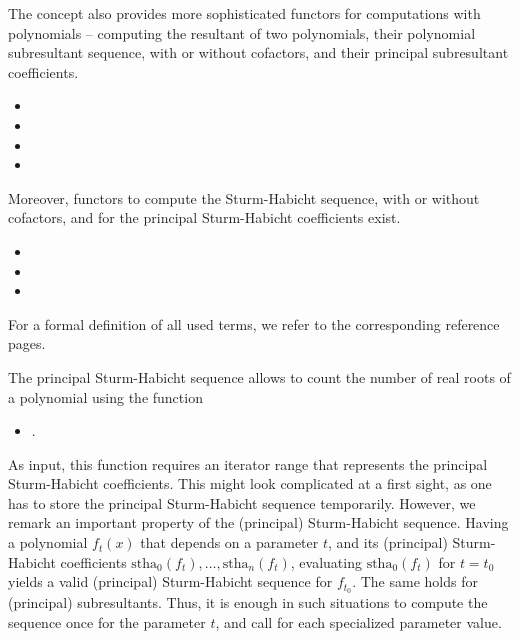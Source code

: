 The  concept also provides more sophisticated functors
for computations with polynomials --
computing the resultant of two polynomials, 
their polynomial subresultant sequence, with or without cofactors,
and their principal subresultant coefficients.
%
\begin{itemize}
\item {}\ccGlue
\item {}\ccGlue
\item {}\ccGlue
\item {}
\end{itemize}
%
Moreover, functors to compute the Sturm-Habicht sequence, with or without
cofactors, and for the principal Sturm-Habicht coefficients exist.
%
\begin{itemize}
\item {}\ccGlue
\item {}\ccGlue
\item {}
\end{itemize}
%
For a formal definition of all used terms, we refer to the corresponding
reference pages.

The principal Sturm-Habicht sequence allows to count the number of
real roots of a polynomial using the function
\begin{itemize}
\item {}.
\end{itemize}
As input, this function requires an iterator range that represents
the principal Sturm-Habicht coefficients. 
This might look complicated at a first sight,
as one has to store the principal Sturm-Habicht sequence temporarily.
However, we remark an important property of the (principal) Sturm-Habicht
sequence. Having a polynomial $f_t(x)$ that depends on a parameter $t$,
and its (principal) Sturm-Habicht coefficients 
$\mathrm{stha}_0(f_t),\ldots,\mathrm{stha}_n(f_t)$, evaluating 
$\mathrm{stha}_0(f_t)$ for $t=t_0$ yields a valid (principal)
Sturm-Habicht sequence for $f_{t_0}$. The same holds for (principal)
subresultants. Thus, it is enough in such situations to compute
the sequence once for the parameter $t$, and call 
 for each specialized parameter
value.

